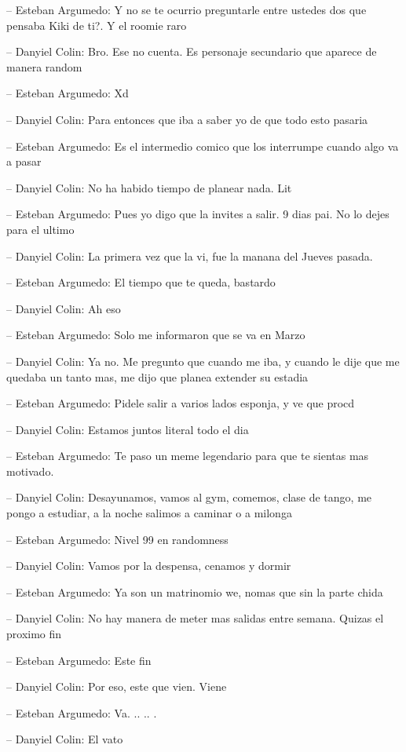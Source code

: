 -- Esteban Argumedo: Y no se te ocurrio preguntarle entre ustedes dos
que pensaba Kiki de ti?. Y el roomie raro

-- Danyiel Colin: Bro. Ese no cuenta. Es personaje secundario que
aparece de manera random

-- Esteban Argumedo: Xd

-- Danyiel Colin: Para entonces que iba a saber yo de que todo esto
pasaria

-- Esteban Argumedo: Es el intermedio comico que los interrumpe cuando
algo va a pasar

-- Danyiel Colin: No ha habido tiempo de planear nada. Lit

-- Esteban Argumedo: Pues yo digo que la invites a salir. 9 dias pai. No
lo dejes para el ultimo

-- Danyiel Colin: La primera vez que la vi, fue la manana del Jueves
pasada.

-- Esteban Argumedo: El tiempo que te queda, bastardo

-- Danyiel Colin: Ah eso

-- Esteban Argumedo: Solo me informaron que se va en Marzo

-- Danyiel Colin: Ya no. Me pregunto que cuando me iba, y cuando le dije
que me quedaba un tanto mas, me dijo que planea extender su estadia

-- Esteban Argumedo: Pidele salir a varios lados esponja, y ve que procd

-- Danyiel Colin: Estamos juntos literal todo el dia

-- Esteban Argumedo: Te paso un meme legendario para que te sientas mas
motivado.

-- Danyiel Colin: Desayunamos, vamos al gym, comemos, clase de tango, me
pongo a estudiar, a la noche salimos a caminar o a milonga

-- Esteban Argumedo: Nivel 99 en randomness

-- Danyiel Colin: Vamos por la despensa, cenamos y dormir

-- Esteban Argumedo: Ya son un matrinomio we, nomas que sin la parte
chida

-- Danyiel Colin: No hay manera de meter mas salidas entre semana.
Quizas el proximo fin

-- Esteban Argumedo: Este fin

-- Danyiel Colin: Por eso, este que vien. Viene

-- Esteban Argumedo: Va. .. .. .

-- Danyiel Colin: El vato

